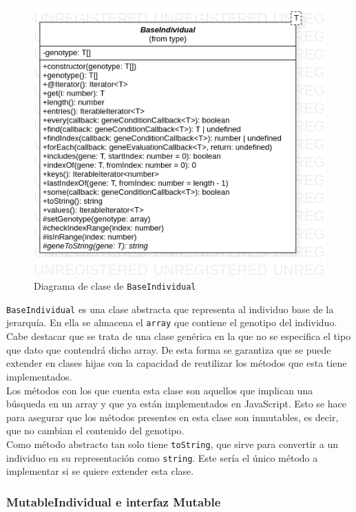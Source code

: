 \begin{figure}[ht]
    \centering
    \includegraphics[scale=0.6]{mem/images/cap-4/4.2.2(Individuos)/BaseIndividual.png}
    \caption{Diagrama de clase de \texttt{BaseIndividual}}
    \label{fig:baseindividual-uml}
\end{figure}

\texttt{BaseIndividual} es una clase abstracta que representa al individuo base de la jerarquía. En ella se almacena el \texttt{array} que contiene el genotipo del individuo. Cabe destacar que se trata de una clase genérica en la que no se especifica el tipo que dato que contendrá dicho array. De esta forma se garantiza que se puede extender en clases hijas con la capacidad de reutilizar los métodos que esta tiene implementados. \\

Los métodos con los que cuenta esta clase son aquellos que implican una búsqueda en un array y que ya están implementados en JavaScript. Esto se hace para asegurar que los métodos presentes en esta clase son inmutables, es decir, que no cambian el contenido del genotipo. \\

Como método abstracto tan solo tiene \texttt{toString}, que sirve para convertir a un individuo en su representación como \texttt{string}. Este sería el único método a implementar si se quiere extender esta clase.

\subsubsection{MutableIndividual e interfaz Mutable}

